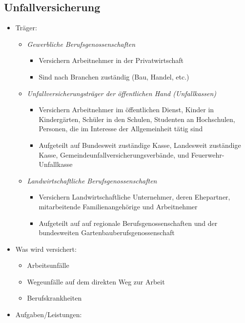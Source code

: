 \documentclass[a4paper, 12pt]{report}
\begin{document}
\newpage
\subsection{Unfallversicherung}

\begin{itemize}
    \item Träger:
	\begin{itemize}
	    \item \emph{Gewerbliche Berufsgenossenschaften}
		\begin{itemize}
		    \item Versichern Arbeitnehmer in der Privatwirtschaft
		    \item Sind nach Branchen zuständig (Bau, Handel, etc.)
		\end{itemize}
	    \item \emph{Unfallversicherungsträger der öffentlichen Hand
		(Unfallkassen)}
		\begin{itemize}
		    \item Versichern Arbeitnehmer im öffentlichen Dienst, Kinder
			in Kindergärten, Schüler in den Schulen, Studenten an
			Hochschulen, Personen, die im Interesse der
			Allgemeinheit tätig sind
		    \item Aufgeteilt auf Bundesweit zuständige Kasse, Landesweit
			zuständige Kasse, Gemeindeunfallversicherungsverbände,
			und Feuerwehr-Unfallkasse
		\end{itemize}
	    \item \emph{Landwirtschaftliche Berufsgenossenschaften}
		\begin{itemize}
		    \item Versichern Landwirtschaftliche Unternehmer, deren
			Ehepartner, mitarbeitende Familienangehörige und
			Arbeitnehmer
		    \item Aufgeteilt auf auf regionale Berufsgenossenschaften
			und der bundesweiten Gartenbauberufsgenossenschaft
		\end{itemize}
	\end{itemize}
    \item Was wird versichert:
	\begin{itemize}
	    \item Arbeitsunfälle
	    \item Wegeunfälle auf dem direkten Weg zur Arbeit
	    \item Berufskrankheiten
	\end{itemize}
    \item Aufgaben/Leistungen:
	\begin{itemize}

\end{itemize}
\end{itemize}
\end{document}
